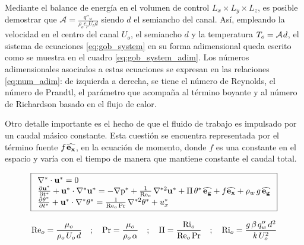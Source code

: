 Mediante el balance de energía en el volumen de control $L_x \times L_y \times L_z$, es posible demostrar que $\mathcal{A} = \frac{q''_w}{\rho_o  c_p U_b d}$ siendo $d$ el semiancho del canal. Así, empleando la velocidad en el centro del canal $U_o$, el semiancho $d$ y la temperatura $T_o = \mathcal{A} \hspace{0.3mm} d $, el sistema de ecuaciones \ref{eq:gob_system} en su forma adimensional queda escrito como se muestra en el cuadro \ref{eq:gob_system_adim}. Los números adimensionales asociados a estas ecuaciones se expresan en las relaciones \ref{eq:num_adim}: de izquierda a derecha, se tiene el número de Reynolds, el número de Prandtl, el parámetro que acompaña al término boyante y al número de Richardson basado en el flujo de calor. 

Otro detalle importante es el hecho de que el fluido de trabajo es impulsado por un caudal másico constante. Esta cuestión se encuentra representada por el término fuente $f \hspace{0.3mm} \mathbf{\widehat{e_x}}$, en la ecuación de momento, donde $f$ es una constante en el espacio y varía con el tiempo de manera que mantiene constante el caudal total. 

\begin{equation}
\boxed{
\begin{array}{l}
    \nabla^* \cdot \mathbf{u^*} = 0 \\
    \frac{\partial \mathbf{u^*}}{\partial t^*} + \mathbf{u^*} \cdot \nabla^* \mathbf{u^*} = 
    -\nabla \text{p}^* + \frac{1}{\text{Re}_o} \hspace{0.5mm} \nabla^{*2} \mathbf{u^*} + \Pi \hspace{0.5mm} \theta^* \hspace{0.5mm} \mathbf{\widehat{e_g}} + f \mathbf{\widehat{e_x}} + \rho_w \hspace{0.5mm} g \hspace{0.5mm} \mathbf{\widehat{e_g}} \\
    \frac{\partial \theta^*}{\partial t^*} + \mathbf{u^*} \cdot \nabla^* \theta^* = 
    \frac{1}{\text{Re}_o \hspace{0.5mm} \text{Pr}} \hspace{0.5mm} \nabla^{*2} \theta^* + u_x^* 
\end{array}
}
\label{eq:gob_system_adim}
\end{equation}

\begin{equation}
\text{Re}_o = \frac{\mu_o}{\rho_o \hspace{0.5mm} U_o \hspace{0.5mm} d } \quad ; \quad \text{Pr}= \frac{\mu_o}{\rho_o \hspace{0.5mm} \alpha} \quad ; \quad \Pi = \frac{\text{Ri}_o}{\text{Re}_o \hspace{0.5mm} \text{Pr}} \quad ; \quad \text{Ri}_o = \frac{g \hspace{0.5mm} \beta \hspace{0.5mm} q''_w \hspace{0.5mm} d^2}{k \hspace{0.5mm} U_o^2}
\label{eq:num_adim}
\end{equation}

